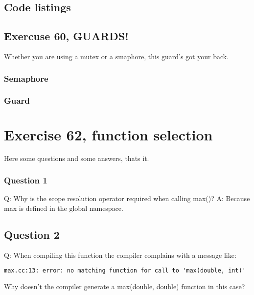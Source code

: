 \documentclass[11pt]{article}
\begin{document}
\subsection*{Code listings}

\subsection*{Exercuse 60, GUARDS!}
Whether you are using a mutex or a smaphore, this guard's got your back.





\subsubsection*{Semaphore}




\subsubsection*{Guard}






\section*{Exercise 62, function selection}
Here some questions and some answers, thats it.
\subsubsection*{Question 1}
Q: Why is the scope resolution operator required when calling max()?
A: Because max is defined in the global namespace.

\subsection*{Question 2}
Q: When compiling this function the compiler complains with a message like:
\begin{lstlisting}
max.cc:13: error: no matching function for call to 'max(double, int)'
\end{lstlisting}
Why doesn't the compiler generate a max(double, double) function in this case? 
\end{document}
